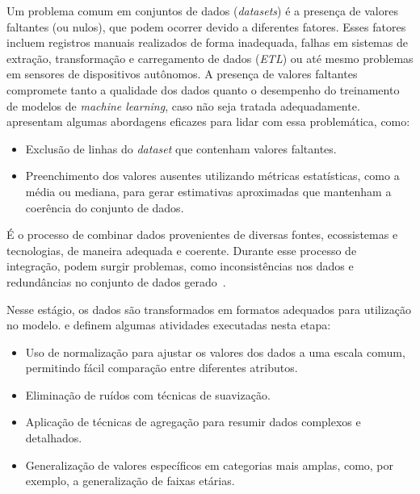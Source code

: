                 Um problema comum em conjuntos de dados (\emph{datasets}) é a presença de valores faltantes (ou nulos), que 
                podem ocorrer devido a diferentes fatores. Esses fatores incluem registros manuais realizados de forma 
                inadequada, falhas em sistemas de extração, transformação e carregamento de dados (\emph{ETL}) ou até mesmo 
                problemas em sensores de dispositivos autônomos. A presença de valores faltantes compromete tanto a qualidade 
                dos dados quanto o desempenho do treinamento de modelos de \emph{machine learning}, caso não seja tratada 
                adequadamente.~ apresentam algumas abordagens eficazes para lidar com essa 
                problemática, como:

                \begin{itemize}
                    \item Exclusão de linhas do \emph{dataset} que contenham valores faltantes.
                    \item Preenchimento dos valores ausentes utilizando métricas estatísticas, como a média ou mediana, 
                    para gerar estimativas aproximadas que mantenham a coerência do conjunto de dados.
                \end{itemize}
                
                É o processo de combinar dados provenientes de diversas fontes, ecossistemas e tecnologias, de maneira adequada 
                e coerente. Durante esse processo de integração, podem surgir problemas, como inconsistências nos dados e 
                redundâncias no conjunto de dados gerado~\cite{sivakumar2017, silva2021, oliveira2024}.

                Nesse estágio, os dados são transformados em formatos adequados para utilização no modelo. 
                 e  definem algumas atividades executadas nesta 
                etapa:

                \begin{itemize} 
                    \item Uso de normalização para ajustar os valores dos dados a uma escala comum, permitindo fácil comparação entre 
                    diferentes atributos. 
                    \item Eliminação de ruídos com técnicas de suavização. 
                    \item Aplicação de técnicas de agregação para resumir dados complexos e detalhados. 
                    \item Generalização de valores específicos em categorias mais amplas, como, por exemplo, a generalização de 
                    faixas etárias. 
                \end{itemize}

